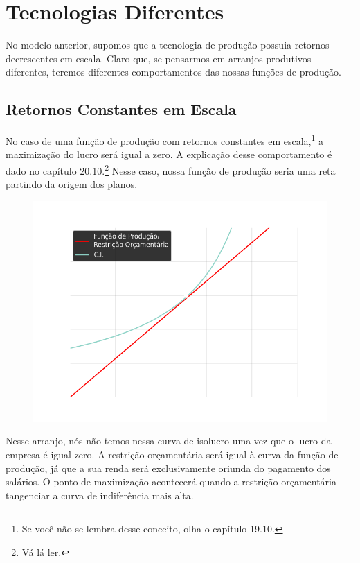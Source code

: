 \documentclass[a4paper,11pt,oneside]{book}
\theoremstyle{definition}
\theoremstyle{break}
\begin{document}
\section{Tecnologias Diferentes}

No modelo anterior, supomos que a tecnologia de produção possuia retornos decrescentes em escala. Claro que, se pensarmos em arranjos produtivos diferentes, teremos diferentes comportamentos das nossas funções de produção.

\subsection{Retornos Constantes em Escala}

No caso de uma função de produção com retornos constantes em escala,\footnote{Se você não se lembra desse conceito, olha o capítulo 19.10.} a maximização do lucro será igual a zero. A explicação desse comportamento é dado no capítulo 20.10.\footnote{Vá lá ler.} Nesse caso, nossa função de produção seria uma reta partindo da origem dos planos.

\begin{figure}[H]
	\centering
	\includegraphics[scale=0.5]{cap33_6-rendimento_constantes.png}
\end{figure}

Nesse arranjo, nós não temos nessa curva de isolucro uma vez que o lucro da empresa é igual zero. A restrição orçamentária será igual à curva da função de produção, já que a sua renda será exclusivamente oriunda do pagamento dos salários. O ponto de maximização acontecerá quando a restrição orçamentária tangenciar a curva de indiferência mais alta.
\end{document}
